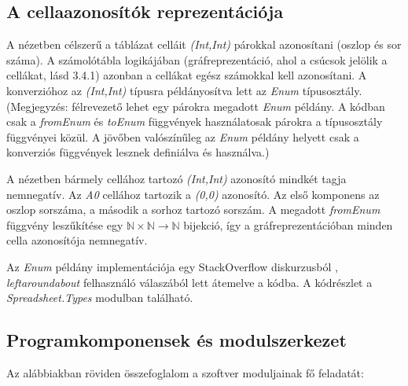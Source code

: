 \subsection{A cellaazonosítók reprezentációja}

A nézetben célszerű a táblázat celláit \textit{(Int,Int)} párokkal azonosítani (oszlop és sor száma). A számolótábla logikájában (gráfreprezentáció, ahol a csúcsok jelölik a cellákat, lásd 3.4.1) azonban a cellákat egész számokkal kell azonosítani. A konverzióhoz az \textit{(Int,Int)} típusra példányosítva lett az \textit{Enum} típusosztály. (Megjegyzés: félrevezető lehet egy párokra megadott \textit{Enum} példány. A kódban csak a \textit{fromEnum} és \textit{toEnum} függvények használatosak párokra a típusosztály függvényei közül. A jövőben valószínűleg az \textit{Enum} példány helyett csak a konverziós függvények lesznek definiálva és használva.)

A nézetben bármely cellához tartozó \textit{(Int,Int)} azonosító mindkét tagja nemnegatív. Az \textit{A0} cellához tartozik a \textit{(0,0)} azonosító. Az első komponens az oszlop sorszáma, a második a sorhoz tartozó sorszám. A megadott \textit{fromEnum} függvény leszűkítése egy $\mathbb{N} \times \mathbb{N} \rightarrow \mathbb{N}$ bijekció, így a gráfreprezentációban minden cella azonosítója nemnegatív.

Az \textit{Enum} példány implementációja egy StackOverflow diskurzusból \cite{enum_stackoverflow}, \textit{leftaroundabout} felhasználó válaszából lett átemelve a kódba. A kódrészlet a \textit{Spreadsheet.Types} modulban található.

\subsection{Programkomponensek és modulszerkezet}

Az alábbiakban röviden összefoglalom a szoftver moduljainak fő feladatát:

